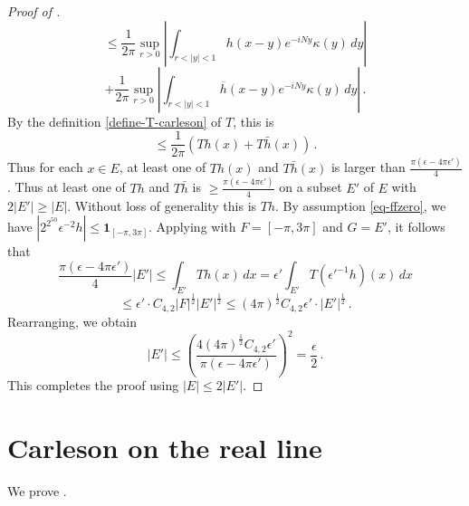 \begin{proof}[Proof of ]
$$
    \le \frac{1}{2\pi} \sup_{r > 0} \left| \int_{r < |y| < 1} h(x-y) e^{-iNy} \kappa(y) \, dy\right|
$$
$$
    + \frac{1}{2\pi} \sup_{r > 0} \left| \int_{r < |y| < 1} \overline{h}(x-y) e^{-iNy} \kappa(y) \, dy\right|\,.
$$
By the definition \eqref{define-T-carleson} of $T$, this is
$$
    \le \frac{1}{2\pi} (Th(x) + T\bar{h}(x))\,.
$$
Thus for each $x \in E$, at least one of $Th(x)$ and $T\bar h(x)$ is larger than $\frac{\pi(\epsilon - 4 \pi\epsilon')}{4}$.
Thus at least one of $Th$ and $T\bar h$ is $\ge \frac{\pi(\epsilon - 4 \pi\epsilon')}{4}$ on a subset $E'$ of $E$ with $2|E'| \ge |E|$. Without loss of generality this is $Th$. By assumption \eqref{eq-ffzero}, we have $|2^{2^{50}}\epsilon^{-2} h| \le \mathbf{1}_{[-\pi, 3\pi]}$. Applying  with $F = [-\pi, 3\pi]$ and $G = E'$, it follows that
$$
    \frac{\pi(\epsilon - 4 \pi\epsilon')}{4} |E'| \le \int_{E'} Th(x) \, dx = \epsilon' \int_{E'} T(\epsilon'^{-1} h)(x) \, dx
$$
$$
    \le \epsilon' \cdot C_{4,2} |F|^{\frac{1}{2}} |E'|^{\frac{1}{2}} \le (4\pi)^\frac{1}{2} C_{4,2} \epsilon' \cdot |E'|^{\frac{1}{2}}\,.
$$
Rearranging, we obtain
$$
    |E'| \le \left(\frac{4 (4\pi)^\frac{1}{2} C_{4,2} \epsilon'}{\pi(\epsilon - 4 \pi\epsilon')}\right)^2 = \frac{\epsilon}{2}\,.
$$
This completes the proof using $|E| \le 2|E'|$.
\end{proof}




\section{Carleson on the real line}
\label{10carleson}

We prove .

